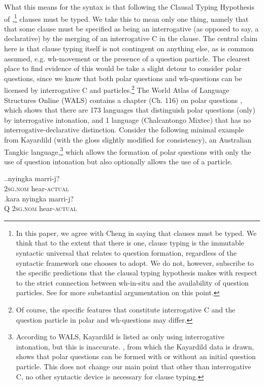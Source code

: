 \documentclass[charis]{glossa}
\begin{document}
What this means for the syntax is that following the Clausal Typing Hypothesis of \cite{cheng:1997},\footnote{In this paper, we agree with Cheng in saying that clauses must be typed. We think that to the extent that there is one, clause typing is the immutable syntactic universal that relates to question formation, regardless of the syntactic framework one chooses to adopt. We do not, however, subscribe to the specific predictions that the clausal typing hypothesis makes with respect to the strict connection between wh-in-situ and the availability of question particles. See \cite{bruening:07} for more substantial argumentation on this point.} clauses must be typed. We take this to mean only one thing, namely that that some clause must be specified as being an interrogative (as opposed to say, a declarative) by the merging of an interrogative C in the clause. The central claim here is that clause typing itself is not contingent on anything else, as is common assumed, e.g. wh-movement or the presence of a question particle. The clearest place to find evidence of this would be take a slight detour to consider polar questions, since we know that both polar questions and wh-questions can be licensed by interrogative C and particles.\footnote{Of course, the specific features that constitute interrogative C and the question particle in polar and wh-questions may differ.} The World Atlas of Language Structures Online (WALS) contains a chapter (Ch. 116) on polar questions \citep{wals116:2013}, which shows that there are 173 languages that distinguish polar questions (only) by interrogative intonation, and 1 language (Chalcantongo Mixtec) that has no interrogative-declarative distinction. Consider the following minimal example from Kayardild (with the gloss slightly modified for consistency), an Australian Tangkic language,\footnote{According to WALS, Kayardild is listed as only using interrogative intonation, but this is inaccurate. \cite{evans:1995}, from which the Kayardild data is drawn, shows that polar questions can be formed with or without an initial question particle. This does not change our main point that other than interrogative C, no other syntactic device is necessary for clause typing.} which allows the formation of polar questions with only the use of question intonation but also optionally allows the use of a particle.

\ex.\ag.\label{wh.101a}nyingka marri-j?\\
   \textsc{2sg.nom} hear-\textsc{actual}\\
   \bg.\label{wh.101b}kara nyingka marri-j?\\
   Q \textsc{2sg.nom} hear-\textsc{actual}\\
   \hspace{\fill}\citep[364--365]{evans:1995}
\end{document}
